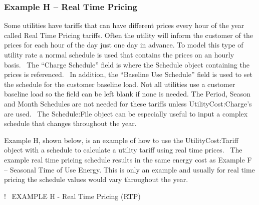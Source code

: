 \subsubsection{Example H -- Real Time Pricing}\label{example-h-real-time-pricing}

Some utilities have tariffs that can have different prices every hour of the year called Real Time Pricing tariffs. Often the utility will inform the customer of the prices for each hour of the day just one day in advance. To model this type of utility rate a normal schedule is used that contains the prices on an hourly basis.~ The ``Charge Schedule'' field is where the Schedule object containing the prices is referenced.~ In addition, the ``Baseline Use Schedule'' field is used to set the schedule for the customer baseline load. Not all utilities use a customer baseline load so the field can be left blank if none is needed. The Period, Season and Month Schedules are not needed for these tariffs unless UtilityCost:Charge's are used.~ The Schedule:File object can be especially useful to input a complex schedule that changes throughout the year.

Example H, shown below, is an example of how to use the UtilityCost:Tariff object with a schedule to calculate a utility tariff using real time prices.~ The example real time pricing schedule results in the same energy cost as Example F -- Seasonal Time of Use Energy. This is only an example and usually for real time pricing the schedule values would vary throughout the year.

!~ EXAMPLE H - Real Time Pricing (RTP)

